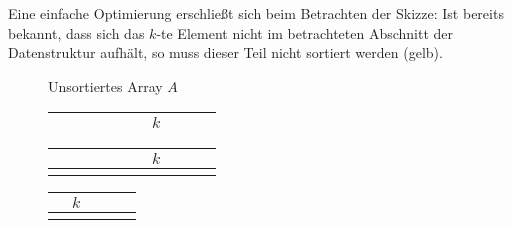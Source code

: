 \documentclass{scrartcl}%
\begin{document}
    Eine einfache Optimierung erschließt sich beim Betrachten der Skizze: Ist bereits bekannt, dass sich das $k$-te Element nicht im betrachteten Abschnitt der Datenstruktur aufhält, so muss dieser Teil nicht sortiert werden (gelb).
    \begin{figure}[htb]
        \centering
        Unsortiertes Array $A$

        \begin{tabular}{|C{1.5em}|C{1.5em}|C{1.5em}|C{1.5em}|C{1.5em}|C{1.5em}|C{1.5em}|C{1.5em}|C{1.5em}|C{1.5em}|}
            \hline
            & & & & & & $k$ & & & \\
            \hline
        \end{tabular}


        \begin{tabular}{|C{1.5em}|C{1.5em}|C{1.5em}|C{1.5em}|C{1.5em}|C{1.5em}|C{1.5em}|C{1.5em}|C{1.5em}|C{1.5em}|}
            \hline
             &  &  &  &  &  &  $k$ &  &  &  \\ \hline
             &  \\
        \end{tabular}


        \begin{tabular}{|C{1.5em}|C{1.5em}|C{1.5em}|C{1.5em}|C{1.5em}|}
            \hline
             &  $k$ &  &  &  \\ \hline
             &  \\
        \end{tabular}

    \end{figure}
\end{document}

